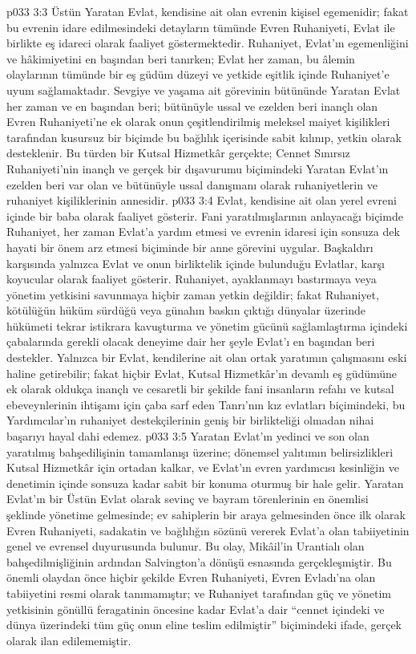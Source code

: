 \vs p033 3:3 Üstün Yaratan Evlat, kendisine ait olan evrenin kişisel egemenidir; fakat bu evrenin idare edilmesindeki detayların tümünde Evren Ruhaniyeti, Evlat ile birlikte eş idareci olarak faaliyet göstermektedir. Ruhaniyet, Evlat’ın egemenliğini ve hâkimiyetini en başından beri tanırken; Evlat her zaman, bu âlemin olaylarının tümünde bir eş güdüm düzeyi ve yetkide eşitlik içinde Ruhaniyet’e uyum sağlamaktadır. Sevgiye ve yaşama ait görevinin bütününde Yaratan Evlat her zaman ve en başından beri; bütünüyle ussal ve ezelden beri inançlı olan Evren Ruhaniyeti’ne ek olarak onun çeşitlendirilmiş meleksel maiyet kişilikleri tarafından kusursuz bir biçimde bu bağlılık içerisinde sabit kılınıp, yetkin olarak desteklenir. Bu türden bir Kutsal Hizmetkâr gerçekte; Cennet Sınırsız Ruhaniyeti’nin inançlı ve gerçek bir dışavurumu biçimindeki Yaratan Evlat’ın ezelden beri var olan ve bütünüyle ussal danışmanı olarak ruhaniyetlerin ve ruhaniyet kişiliklerinin annesidir.
\vs p033 3:4 Evlat, kendisine ait olan yerel evreni içinde bir baba olarak faaliyet gösterir. Fani yaratılmışlarının anlayacağı biçimde Ruhaniyet, her zaman Evlat’a yardım etmesi ve evrenin idaresi için sonsuza dek hayati bir önem arz etmesi biçiminde bir anne görevini uygular. Başkaldırı karşısında yalnızca Evlat ve onun birliktelik içinde bulunduğu Evlatlar, karşı koyucular olarak faaliyet gösterir. Ruhaniyet, ayaklanmayı bastırmaya veya yönetim yetkisini savunmaya hiçbir zaman yetkin değildir; fakat Ruhaniyet, kötülüğün hüküm sürdüğü veya günahın baskın çıktığı dünyalar üzerinde hükümeti tekrar istikrara kavuşturma ve yönetim gücünü sağlamlaştırma içindeki çabalarında gerekli olacak deneyime dair her şeyle Evlat’ı en başından beri destekler. Yalnızca bir Evlat, kendilerine ait olan ortak yaratımın çalışmasını eski haline getirebilir; fakat hiçbir Evlat, Kutsal Hizmetkâr’ın devamlı eş güdümüne ek olarak oldukça inançlı ve cesaretli bir şekilde fani insanların refahı ve kutsal ebeveynlerinin ihtişamı için çaba sarf eden Tanrı’nın kız evlatları biçimindeki, bu Yardımcılar’ın ruhaniyet destekçilerinin geniş bir birlikteliği olmadan nihai başarıyı hayal dahi edemez.
\vs p033 3:5 Yaratan Evlat’ın yedinci ve son olan yaratılmış bahşedilişinin tamamlanışı üzerine; dönemsel yalıtımın belirsizlikleri Kutsal Hizmetkâr için ortadan kalkar, ve Evlat’ın evren yardımcısı kesinliğin ve denetimin içinde sonsuza kadar sabit bir konuma oturmuş bir hale gelir. Yaratan Evlat’ın bir Üstün Evlat olarak sevinç ve bayram törenlerinin en önemlisi şeklinde yönetime gelmesinde; ev sahiplerin bir araya gelmesinden önce ilk olarak Evren Ruhaniyeti, sadakatin ve bağlılığın sözünü vererek Evlat’a olan tabiiyetinin genel ve evrensel duyurusunda bulunur. Bu olay, Mikâil’in Urantialı olan bahşedilmişliğinin ardından Salvington’a dönüşü esnasında gerçekleşmiştir. Bu önemli olaydan önce hiçbir şekilde Evren Ruhaniyeti, Evren Evladı’na olan tabiiyetini resmi olarak tanımamıştır; ve Ruhaniyet tarafından güç ve yönetim yetkisinin gönüllü feragatinin öncesine kadar Evlat’a dair “cennet içindeki ve dünya üzerindeki tüm güç onun eline teslim edilmiştir” biçimindeki ifade, gerçek olarak ilan edilememiştir.
